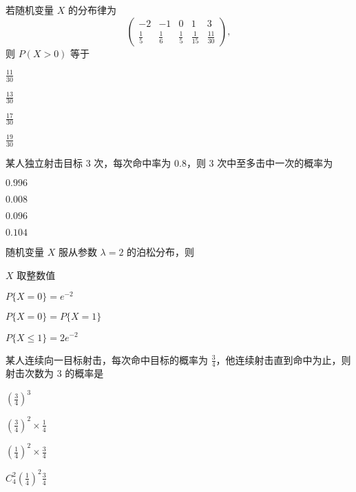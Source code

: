 \documentclass{exam-zh}
\begin{document}
\begin{question}
  若随机变量 $X$ 的分布律为  
  $$
  \begin{pmatrix}
  -2 & -1 & 0 & 1 & 3 \\
  \frac{1}{5} & \frac{1}{6} & \frac{1}{5} & \frac{1}{15} & \frac{11}{30}
  \end{pmatrix},
  $$  
  则 $P(X > 0)$ 等于 \paren[B]
  \begin{choices}
    \item $\frac{11}{30}$  
    \item $\frac{13}{30}$  
    \item $\frac{17}{30}$  
    \item $\frac{19}{30}$  
  \end{choices}
\end{question}

\begin{question}
  某人独立射击目标 $3$ 次，每次命中率为 $0.8$，则 $3$ 次中至多击中一次的概率为 \paren[D]
  \begin{choices}
    \item $0.996$  
    \item $0.008$  
    \item $0.096$  
    \item $0.104$  
  \end{choices}
\end{question}

\begin{question}
  随机变量 $X$ 服从参数 $\lambda = 2$ 的泊松分布，则 \paren[B]
  \begin{choices}
    \item $X$ 取整数值  
    \item $P\{X = 0\} = e^{-2}$  
    \item $P\{X = 0\} = P\{X = 1\}$  
    \item $P\{X \leq 1\} = 2e^{-2}$  
  \end{choices}
\end{question}

\begin{question}
  某人连续向一目标射击，每次命中目标的概率为 $\frac{3}{4}$，他连续射击直到命中为止，则射击次数为 $3$ 的概率是 \paren[C]
  \begin{choices}
    \item $(\frac{3}{4})^3$  
    \item $(\frac{3}{4})^2 \times \frac{1}{4}$  
    \item $(\frac{1}{4})^2 \times \frac{3}{4}$  
    \item $C_4^2 (\frac{1}{4})^2 \frac{3}{4}$  
  \end{choices}
\end{question}
\end{document}
